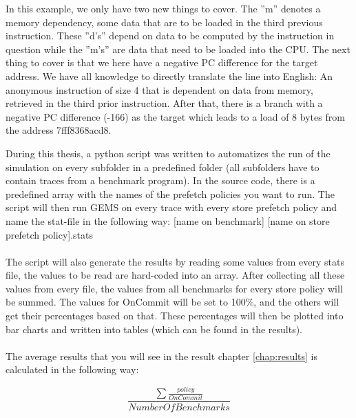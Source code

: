 In this example, we only have two new things to cover. The ”m” denotes a memory dependency, some data that
are to be loaded in the third previous instruction. These ”d's” depend on
data to be computed by the instruction in question while the ”m's” are data that
need to be loaded into the CPU. The next thing to cover is that we here have a
negative PC difference for the target address. We have all knowledge to directly
translate the line into English: An anonymous instruction of size 4 that is dependent on
data from memory, retrieved in the third prior instruction. After that, there
is a branch with a negative PC difference (-166) as the target which leads to a load
of 8 bytes from the address 7fff8368acd8.

During this thesis, a python script was written to automatizes the run of the simulation
on every subfolder in a predefined folder (all subfolders have to contain traces
from a benchmark program). In the source code, there is a predefined array with the
names of the prefetch policies you want to run. The script will then run GEMS on
every trace with every store prefetch policy and name the stat-file in the following
way: [name on benchmark] [name on store prefetch policy].stats
 \\ \\
The script will also generate the results by reading some values from every stats file,
the values to be read are hard-coded into an array. After collecting all these
values from every file, the values from all benchmarks for every store policy will be
summed. The values for OnCommit will be set to 100\%, and the others will get their
percentages based on that. These percentages will then be plotted into bar charts and written into tables (which
can be found in the results).
\\\\
The average results that you will see in the result chapter \ref{chap:results} is calculated in the following way:

$$\frac{\sum \frac{policy}{OnCommit}}{NumberOfBenchmarks}$$ 

